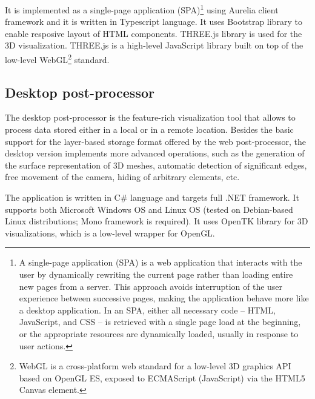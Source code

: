 It is implemented as a single-page application (SPA)\footnote{A single-page application (SPA) is a web application that interacts with the user by dynamically rewriting the current page rather than loading entire new pages from a server. This approach avoids interruption of the user experience between successive pages, making the application behave more like a desktop application. In an SPA, either all necessary code -- HTML, JavaScript, and CSS -- is retrieved with a single page load at the beginning, or the appropriate resources are dynamically loaded, usually in response to user actions.} using Aurelia client framework \cite{Aurelia} and it is written in Typescript language. It uses Bootstrap library \cite{Bootstrap} to enable resposive layout of HTML components. THREE.js library \cite{THREEjs} is used for the 3D visualization. THREE.js is a high-level JavaScript library built on top of the low-level WebGL\footnote{WebGL is a cross-platform web standard for a low-level 3D graphics API based on OpenGL ES, exposed to ECMAScript (JavaScript) via the HTML5 Canvas element.} standard.


\subsection*{Desktop post-processor}

The desktop post-processor is the feature-rich visualization tool that allows to process data stored either in a local or in a remote location. Besides the basic support for the layer-based storage format offered by the web post-processor, the desktop version implements more advanced operations, such as the generation of the surface representation of 3D meshes, automatic detection of significant edges, free movement of the camera, hiding of arbitrary elements, etc.

The application is written in C\# language and targets full .NET framework. It supports both Microsoft Windows OS and Linux OS (tested on Debian-based Linux distributions; Mono framework \cite{MonoProject} is required). It uses OpenTK library \cite{OpenTK} for 3D visualizations, which is a low-level wrapper for OpenGL.

